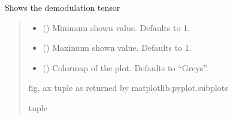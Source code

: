 \documentclass[letterpaper,10pt,english]{sphinxmanual}
\begin{document}
\begin{fulllineitems}
\begin{fulllineitems}
\label{\detokenize{micropolarray.processing:micropolarray.processing.demodulation.Demodulator.show}}
\pysigstartsignatures
{}
\pysigstopsignatures
\sphinxAtStartPar
Shows the demodulation tensor
\begin{quote}\begin{description}
\begin{itemize}
\item {} 
\sphinxAtStartPar
{} (\sphinxstyleliteralemphasis{\sphinxupquote{, }}) \textendash{} Minimum shown value. Defaults to \sphinxhyphen{}1.

\item {} 
\sphinxAtStartPar
{} (\sphinxstyleliteralemphasis{\sphinxupquote{, }}) \textendash{} Maximum shown value. Defaults to 1.

\item {} 
\sphinxAtStartPar
{} (\sphinxstyleliteralemphasis{\sphinxupquote{, }}) \textendash{} Colormap of the plot. Defaults to “Greys”.

\end{itemize}

\sphinxAtStartPar
fig, ax tuple as returned by matplotlib.pyplot.subplots

\sphinxAtStartPar
tuple

\end{description}\end{quote}

\end{fulllineitems}


\begin{fulllineitems}
\label{\detokenize{micropolarray.processing:micropolarray.processing.demodulation.Demodulator.tk}}
\pysigstartsignatures
{}
\pysigstopsignatures
\end{fulllineitems}


\end{fulllineitems}
\end{document}
